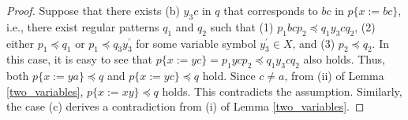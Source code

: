 \begin{proof}
  Suppose that there exists (b) $y_{3}c$ in $q$ that corresponds to $bc$ in $p\{x:=bc\}$, i.e., there exist regular patterns $q_{1}$ and $q_{2}$ such that (1) $p_{1}bcp_{2} \preceq q_{1}y_{3}cq_{2}$, (2) either $p_{1} \preceq q_{1}$ or $p_{1} \preceq q_{3}y_{3}^{\prime}$ for some variable symbol $y_{3}^{\prime}\in X$, and (3) $p_{2} \preceq q_{2}$.
  In this case, it is easy to see that $p\{x:=yc\} = p_{1}ycp_{2} \preceq q_{1}y_{3}cq_{2}$ also holds. Thus, both $p\{x:=ya\}\preceq q$ and $p\{x:=yc\}\preceq q$ hold. Since $c\not= a$, from (ii) of Lemma \ref{two_variables}, $p\{x:=xy\}\preceq q$ holds. This contradicts the assumption. Similarly, the case (c) derives a contradiction from (i) of Lemma \ref{two_variables}.
%

\end{proof}
